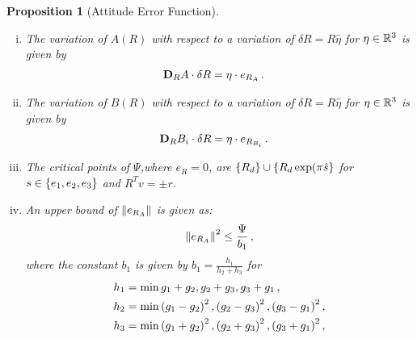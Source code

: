 \documentclass[letterpaper, 10 pt, conference]{ieeeconf}  %
\newtheorem{prop}{Proposition}
\begin{document}
\begin{prop}[Attitude Error Function]
\begin{enumerate}[(i)]
	\begin{align}
		\dirDiff{\Psi}{R} &= \dirDiff{A}{R} \,  B(R) + A \,  \dirDiff{B}{R} \, . \\
	\end{align}
	\item \label{item:prop_era}The variation of \( A(R) \) with respect to a variation of \( \delta R = R \hat{\eta} \) for \( \eta \in \mathbb{R}^3 \) is given by
	\begin{align}
		\mathbf{D}_{R} A \cdot \delta R &= \eta \cdot e_{R_A} \, .
	\end{align}
	\item \label{item:prop_erb} The variation of \( B(R) \) with respect to a variation of \( \delta R = R \hat{\eta} \) for \( \eta \in \mathbb{R}^3 \) is given by
	\begin{align}
		\mathbf{D}_{R} B_i \cdot \delta R &= \eta \cdot e_{R_{B_i}} \, .
	\end{align}
	\item \label{item:prop_crit}The critical points of \( \Psi \),where \( e_R = 0\), are \( \left\{ R_d \right\} \cup \left\{ R_d \exp(\pi \hat{s} \right\} \) for \( s \in \left\{ e_1, e_2, e_3 \right\} \) and \( R^T v = \pm r \).
	\item \label{item:prop_era_upbound}An upper bound of \( \left\| e_{R_A} \right\| \) is given as:
	\begin{align}
		\left\| e_{R_A} \right\|^2 \leq \frac{\Psi}{b_1} \, , \label{eqn:psi_lower_bound}
	\end{align}
	where the constant \( b_1 \) is given by \( b_1 = \frac{h_1}{h_2 + h_3} \) for 
	\begin{align*}
		h_1 &= \min{g_1 + g_2, g_2 + g_3 , g_3 + g_1} \, ,\\
		h_2 &= \min{\ensuremath{\left( g_1 -g_2 \right)}^2,\ensuremath{\left( g_2 -g_3 \right)}^2 , \ensuremath{\left( g_3 -g_1 \right)}^2} \, ,\\
		h_3 &= \min{\ensuremath{\left( g_1 + g_2 \right)}^2, \ensuremath{\left( g_2 + g_3 \right)}^2 , \ensuremath{\left( g_3 + g_1 \right)}^2} \, ,\\				
	\end{align*}
\end{enumerate}
\end{prop}
\end{document}
